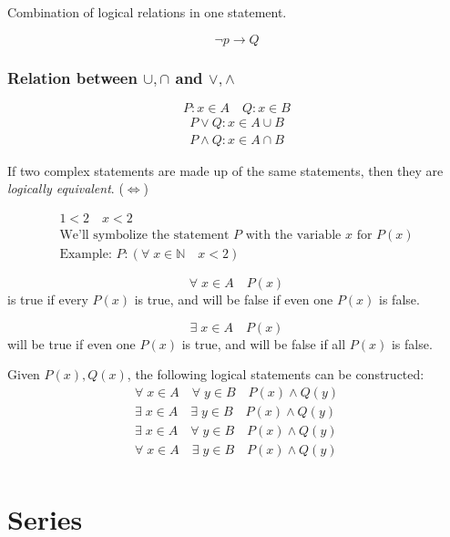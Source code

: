 \documentclass[00_complete]{subfiles}
\begin{document}
\begin{definition}
Combination of logical relations in one statement.
\begin{example}
    $$\neg p \to Q$$
\end{example}
\end{definition}

\subsubsection{Relation between $\cup, \cap$ and $\lor, \land$}
$$P : x \in A \quad Q: x \in B$$
$$
\begin{gathered}
    P \lor Q : x \in A \cup B \\
    P \land Q: x \in A \cap B
\end{gathered}
$$

\begin{definition}
If two complex statements are made up of the same statements, then they are
\emph{logically equivalent}. ($\iff$)
\end{definition}

$$
\begin{gathered}
    1<2 \quad x<2 \\
    \text{We'll symbolize the statement $P$ with the variable $x$ for $P(x)$} \\
    \text{Example: }P: (\forall \; x \in \mathbb{N} \quad x<2)
\end{gathered}
$$

$$\forall \; x \in A \quad P(x)$$
is true if every $P(x)$ is true, and will be false if even one $P(x)$ is false.

$$\exists \; x \in A \quad P(x)$$
will be true if even one $P(x)$ is true, and will be false if all $P(x)$ is false.

Given $P(x), Q(x)$, the following logical statements can be constructed:
$$
\begin{gathered}
    \forall \; x \in A \quad \forall \; y \in B \quad P(x) \land Q(y) \\
    \exists \; x \in A \quad \exists \; y \in B \quad P(x) \land Q(y) \\
    \exists \; x \in A \quad \forall \; y \in B \quad P(x) \land Q(y) \\
    \forall \; x \in A \quad \exists \; y \in B \quad P(x) \land Q(y) \\
\end{gathered}
$$

\section{Series}
\end{document}
